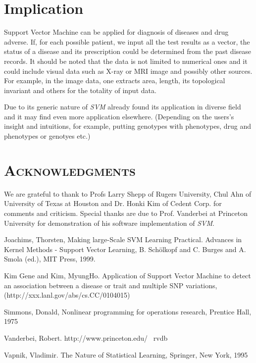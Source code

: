 \documentclass{amsart}%
\theoremstyle{plain}
\numberwithin{equation}{section}
\begin{document}
\section{Implication}

Support Vector Machine can be applied for diagnosis of diseases and drug adverse. If, for each possible patient, we input all the test results as a vector, the status of a disease and its prescription could be determined from the past disease records. It should be
noted that the data is not limited to numerical ones and it could include
visual data such as X-ray or MRI image and possibly other sources. For example, in the image data, one extracts area, length, its topological invariant and
others for the totality of input data.

Due to its generic nature of \emph{SVM} already found its application in
diverse field and it may find even more application elsewhere. (Depending on
the users's insight and intuitions, for example, putting genotypes with phenotypes, drug and phenotypes or genotyes etc.)

\section{\textsc{Acknowledgments}}

We are grateful to thank to Profs Larry Shepp of Rugers University, Chul Ahn
of University of Texas at Houston and Dr. Honki Kim of Cedent Corp.
for comments and criticism. Special thanks are due to Prof. Vanderbei at
Princeton University for demonstration of his software implementation of 
\emph{SVM}.

\begin{thebibliography}{1}
  Joachims, Thorsten, Making large-Scale SVM Learning
Practical. Advances in Kernel Methods - Support Vector Learning, B.
Sch\"{o}lkopf and C. Burges and A. Smola (ed.), MIT Press, 1999.

  Kim Gene and Kim, MyungHo. Application of Support Vector
Machine to detect an association between a disease or trait and multiple SNP
variations, (http://xxx.lanl.gov/abs/cs.CC/0104015)

  Simmons, Donald, Nonlinear programming for operations
research, Prentice Hall, 1975

  Vanderbei, Robert. http://www.princeton.edu/~ rvdb

  Vapnik, Vladimir. The Nature of Statistical Learning,
Springer, New York, 1995
\end{thebibliography}
\end{document}
